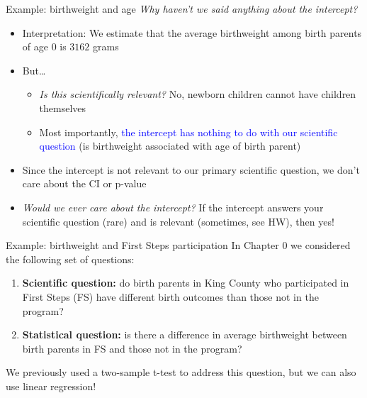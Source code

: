 \documentclass[10pt,t]{beamer}
\begin{document}
\begin{frame}{Example: birthweight and age}
\textit{Why haven't we said anything about the intercept?}
\vspace{0.3cm}
\begin{itemize}
	\item Interpretation: We estimate that the average birthweight among birth parents of age $0$ is $3162$ grams
	\item But\dots
	\begin{itemize}
		\item \textit{Is this scientifically relevant?} No, newborn children cannot have children themselves
		\item Most importantly, \textcolor{blue}{the intercept has nothing to do with our scientific question} (is birthweight associated with age of birth parent)
	\end{itemize}
	\item Since the intercept is not relevant to our primary scientific question, we don't care about the CI or p-value
	\item \textit{Would we ever care about the intercept?} If the intercept answers your scientific question (rare) and is relevant (sometimes, see HW), then yes!
\end{itemize}
\end{frame}

\begin{frame}{Example: birthweight and First Steps participation}
In Chapter 0 we considered the following set of questions:

\vspace{0.3cm}

\begin{enumerate}
	\item \textbf{Scientific question:} do birth parents in King County who participated in First Steps (FS) have different birth outcomes than those not in the program?
	\item \textbf{Statistical question:} is there a difference in average birthweight between birth parents in FS and those not in the program?
\end{enumerate}

\vspace{0.3cm} We previously used a two-sample t-test to address this question, but we can also use linear regression!

\end{frame}
\end{document}

